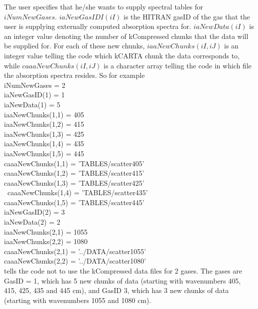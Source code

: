 \documentclass[12pt]{article}
\newcommand{\kc}{\textsf{kCARTA}\xspace}
\newcommand{\cm}{\hbox{cm}}
\newcommand{\ttab}{\indent\indent}
\begin{document}
{{The user specifies that he/she wants to supply spectral tables for 
$iNumNewGases$.
$iaNewGasIDI(iI)$ is the HITRAN gasID of the gas that the user is supplying 
externally computed absorption spectra for. $iaNewData(iI)$ is an integer 
value denoting the number of kCompressed chunks that the data will be 
supplied for. For each of these new chunks, $iaaNewChunks(iI,iJ)$ 
is an integer value telling the code which \kc chunk the data corresponds to, 
while $caaaNewChunks(iI,iJ)$ is a character array telling the code in which 
file the absorption spectra resides. So for example\\

\medskip
\ttab  iNumNewGases   =             2 \\
\ttab  iaNewGasID(1)  =             1\\
\ttab  iaNewData(1)   =             5\\
\ttab  \ttab iaaNewChunks(1,1)    =           405\\
\ttab  \ttab iaaNewChunks(1,2)    =           415\\
\ttab  \ttab iaaNewChunks(1,3)    =           425\\
\ttab  \ttab iaaNewChunks(1,4)    =           435\\
\ttab  \ttab iaaNewChunks(1,5)    =           445\\
\ttab  \ttab    caaaNewChunks(1,1)     =   'TABLES/scatter405'\\
\ttab  \ttab    caaaNewChunks(1,2)     =   'TABLES/scatter415'\\
\ttab  \ttab    caaaNewChunks(1,3)     =   'TABLES/scatter425'\\\
\ttab  \ttab    caaaNewChunks(1,4)     =   'TABLES/scatter435'\\
\ttab  \ttab    caaaNewChunks(1,5)     =   'TABLES/scatter445'\\
 iaNewGasID(2)  =             3\\
 iaNewData(2)   =             2\\
\ttab  \ttab  iaaNewChunks(2,1)    =           1055 \\
\ttab  \ttab  iaaNewChunks(2,2)    =           1080\\
\ttab  \ttab      caaaNewChunks(2,1)     =   '../DATA/scatter1055'\\
\ttab  \ttab      caaaNewChunks(2,2)     =   '../DATA/scatter1080'\\


tells the code not to use the kCompressed data files for 2 gases. The gases
are GasID = 1, which has 5 new chunks of data (starting with wavenumbers 405, 
415, 425, 435 and 445 \cm), and GasID 3, which has 3 new chunks of data 
(starting with wavenumbers 1055 and 1080 \cm).

}}
\end{document}
